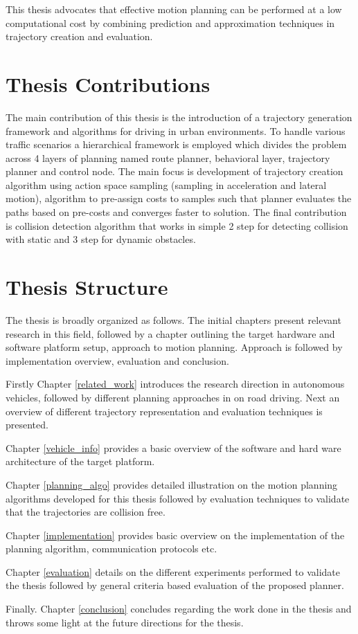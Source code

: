 This thesis advocates that effective motion planning can be performed at a low computational cost by combining prediction and approximation techniques in trajectory creation and evaluation. 



\section{Thesis Contributions}

The main contribution of this thesis is the introduction of a trajectory generation framework and algorithms for driving in urban environments. To handle various traffic scenarios a hierarchical framework is employed which divides the problem across 4 layers of planning named route planner, behavioral layer, trajectory planner and control node. The main focus is development of trajectory creation algorithm using action space sampling (sampling in acceleration and lateral motion), algorithm to pre-assign costs to samples such that planner evaluates the paths based on pre-costs and converges faster to solution. The final contribution is collision detection algorithm that works in simple 2 step for detecting collision with static and 3 step for dynamic obstacles. 

\section{Thesis Structure}

The thesis is broadly organized as follows. The initial chapters present relevant research in this field, followed by a chapter outlining the target hardware and software platform setup, approach to motion planning. Approach is followed by implementation overview, evaluation and conclusion. 


Firstly Chapter \ref{related_work} introduces the research direction in autonomous vehicles, followed by different planning approaches in on road driving. Next an overview of different trajectory representation and evaluation techniques is presented. 

Chapter \ref{vehicle_info} provides a basic overview of the software and hard ware architecture of the target platform. 

Chapter \ref{planning_algo} provides detailed illustration on the motion planning algorithms developed for this thesis followed by evaluation techniques to validate that the trajectories are collision free. 

Chapter \ref{implementation} provides basic overview on the implementation of the planning algorithm, communication protocols etc. 

Chapter \ref{evaluation} details on the different experiments performed to validate the thesis followed by general criteria based evaluation of the proposed planner. 

Finally. Chapter \ref{conclusion} concludes regarding the work done in the thesis and throws some light at the future directions for the thesis. 
